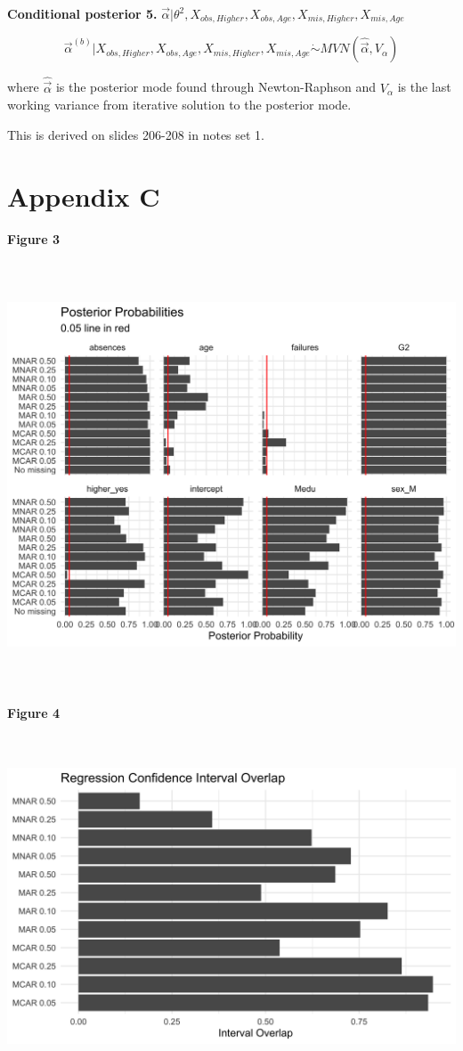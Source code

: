 \documentclass[11pt]{article}
\begin{document}
\textbf{Conditional posterior 5.} $\vec\alpha| \theta^2, X_{obs, Higher}, X_{obs, Age}, X_{mis, Higher}, X_{mis, Age}$

$$\vec\alpha^{(b)}|  X_{obs, Higher}, X_{obs, Age}, X_{mis, Higher}, X_{mis, Age} \dot\sim MVN(\hat{\vec\alpha}, V_{\alpha})$$

where $\hat{\vec\alpha}$ is the posterior mode found through Newton-Raphson and $V_{\alpha}$ is the last working variance from iterative solution to the posterior mode.

This is derived on slides 206-208 in notes set 1.

\newpage

\section{Appendix C}

\textbf{Figure 3}

\includegraphics[width=6.5in, height=5in]{posterior-probabilities-1}

\textbf{Figure 4}

\includegraphics[width=6.5in, height=4in]{credible-interval-overlap-overall-1}

\newpage



\end{document}
